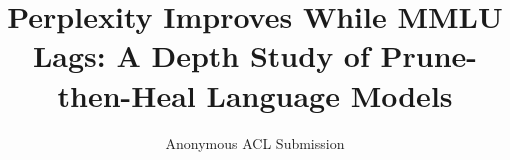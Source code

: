 \documentclass[11pt]{article}
\title{Perplexity Improves While MMLU Lags: A Depth Study of
Prune-then-Heal Language Models}
\author{Anonymous ACL Submission}
\begin{document}
\maketitle








\FloatBarrier

\FloatBarrier

\FloatBarrier





\clearpage
\appendix
\raggedbottom

\end{document}
